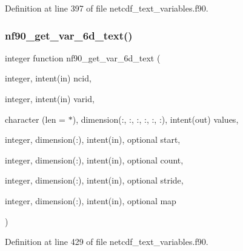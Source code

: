 Definition at line 397 of file netcdf\+\_\+text\+\_\+variables.\+f90.

\mbox{\label{netcdf__text__variables_8f90_aa66c41c62185789bb5e8994a5370c57f}} 
\subsubsection{\texorpdfstring{nf90\+\_\+get\+\_\+var\+\_\+6d\+\_\+text()}{nf90\_get\_var\_6d\_text()}}
{\footnotesize\ttfamily integer function nf90\+\_\+get\+\_\+var\+\_\+6d\+\_\+text (\begin{DoxyParamCaption}\item[{integer, intent(in)}]{ncid,  }\item[{integer, intent(in)}]{varid,  }\item[{character (len = $\ast$), dimension(\+:, \+:, \+:, \+:, \+:, \+:), intent(out)}]{values,  }\item[{integer, dimension(\+:), intent(in), optional}]{start,  }\item[{integer, dimension(\+:), intent(in), optional}]{count,  }\item[{integer, dimension(\+:), intent(in), optional}]{stride,  }\item[{integer, dimension(\+:), intent(in), optional}]{map }\end{DoxyParamCaption})}



Definition at line 429 of file netcdf\+\_\+text\+\_\+variables.\+f90.

\mbox{\label{netcdf__text__variables_8f90_a0f635c51a727d97eb7edf3784159ff5c}} 
